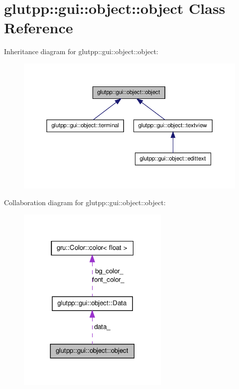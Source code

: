 \hypertarget{classglutpp_1_1gui_1_1object_1_1object}{\section{glutpp\-:\-:gui\-:\-:object\-:\-:object \-Class \-Reference}
\label{classglutpp_1_1gui_1_1object_1_1object}
}


\-Inheritance diagram for glutpp\-:\-:gui\-:\-:object\-:\-:object\-:\nopagebreak
\begin{figure}[H]
\begin{center}
\leavevmode
\includegraphics[width=350pt]{classglutpp_1_1gui_1_1object_1_1object__inherit__graph}
\end{center}
\end{figure}


\-Collaboration diagram for glutpp\-:\-:gui\-:\-:object\-:\-:object\-:\nopagebreak
\begin{figure}[H]
\begin{center}
\leavevmode
\includegraphics[width=206pt]{classglutpp_1_1gui_1_1object_1_1object__coll__graph}
\end{center}
\end{figure}
